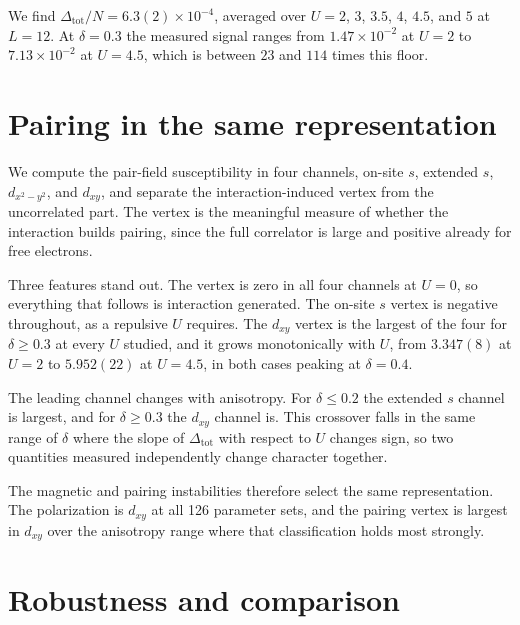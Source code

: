 \documentclass[aps,prl,reprint,superscriptaddress,amsmath,amssymb,floatfix]{revtex4-2}
\begin{document}
We find $\Delta_{\mathrm{tot}}/N = 6.3(2)\times10^{-4}$, averaged over
$U = 2$, $3$, $3.5$, $4$, $4.5$, and $5$ at $L = 12$.
At $\delta = 0.3$ the measured signal ranges from $1.47\times10^{-2}$ at
$U = 2$ to $7.13\times10^{-2}$ at $U = 4.5$, which is between $23$ and $114$
times this floor.

\section{Pairing in the same representation}

We compute the pair-field susceptibility in four channels, on-site $s$,
extended $s$, $d_{x^2-y^2}$, and $d_{xy}$, and separate the interaction-induced
vertex from the uncorrelated part. The vertex is the meaningful measure of
whether the interaction builds pairing, since the full correlator is large and
positive already for free electrons.

Three features stand out. The vertex is zero in all four channels at $U = 0$,
so everything that follows is interaction generated. The on-site $s$ vertex is
negative throughout, as a repulsive $U$ requires. The $d_{xy}$ vertex is the
largest of the four for $\delta \geq 0.3$ at every $U$ studied, and it grows
monotonically with $U$, from $3.347(8)$ at $U = 2$ to $5.952(22)$ at
$U = 4.5$, in both cases peaking at $\delta = 0.4$.

The leading channel changes with anisotropy. For $\delta \leq 0.2$ the extended
$s$ channel is largest, and for $\delta \geq 0.3$ the $d_{xy}$ channel is. This
crossover falls in the same range of $\delta$ where the slope of
$\Delta_{\mathrm{tot}}$ with respect to $U$ changes sign, so two quantities
measured independently change character together.

The magnetic and pairing instabilities therefore select the same
representation. The polarization is $d_{xy}$ at all 126 parameter sets, and the
pairing vertex is largest in $d_{xy}$ over the anisotropy range where that
classification holds most strongly.

\section{Robustness and comparison}
\end{document}
